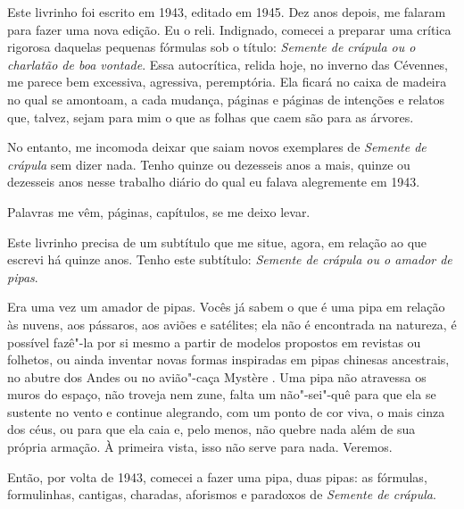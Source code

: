\pagebreak
\thispagestyle{empty}
\movetooddpage
\thispagestyle{empty}
\begin{vplace}[0.25]


{\large{}}
\end{vplace}

\pagebreak
\thispagestyle{empty}

\movetooddpage

Este livrinho foi escrito em 1943, editado em 1945. Dez anos depois, me
falaram para fazer uma nova edição. Eu o reli. Indignado, comecei a
preparar uma crítica rigorosa daquelas pequenas fórmulas sob o título:
\emph{Semente de crápula ou o charlatão de boa vontade}. Essa
autocrítica, relida hoje, no inverno das Cévennes, me parece bem
excessiva, agressiva, peremptória. Ela ficará no caixa de madeira no
qual se amontoam, a cada mudança, páginas e páginas de intenções e
relatos que, talvez, sejam para mim o que as folhas que caem são para as
árvores.

No entanto, me incomoda deixar que saiam novos exemplares de
\emph{Semente de crápula} sem dizer nada. Tenho quinze ou dezesseis anos
a mais, quinze ou dezesseis anos nesse trabalho diário do qual eu falava
alegremente em 1943.

Palavras me vêm, páginas, capítulos, se me deixo levar.

Este livrinho precisa de um subtítulo que me situe, agora, em relação ao
que escrevi há quinze anos. Tenho este subtítulo: \emph{Semente de
crápula ou o amador de pipas}.

Era uma vez um amador de pipas. Vocês já sabem o que é uma pipa em
relação às nuvens, aos pássaros, aos aviões e satélites; ela não é
encontrada na natureza, é possível fazê"-la por si mesmo a partir de
modelos propostos em revistas ou folhetos, ou ainda inventar novas
formas inspiradas em pipas chinesas ancestrais, no abutre dos Andes ou
no avião"-caça Mystère . Uma pipa não atravessa os muros do espaço, não
troveja nem zune, falta um não"-sei"-quê para que ela se sustente no vento
e continue alegrando, com um ponto de cor viva, o mais cinza dos céus,
ou para que ela caia e, pelo menos, não quebre nada além de sua própria
armação. À primeira vista, isso não serve para nada. Veremos.

Então, por volta de 1943, comecei a fazer uma pipa, duas pipas: as
fórmulas, formulinhas, cantigas, charadas, aforismos e paradoxos de
\emph{Semente de crápula}.

